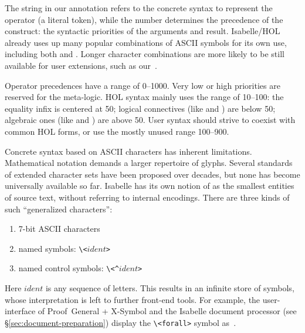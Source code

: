 \begin{isabellebody}
\begin{isamarkuptext}
  The string \isa{{\isachardoublequote}{\isacharbrackleft}{\isacharplus}{\isacharbrackright}{\isachardoublequote}} in our annotation refers to the
  concrete syntax to represent the operator (a literal token), while
  the number  determines the precedence of the construct:
  the syntactic priorities of the arguments and result.  Isabelle/HOL
  already uses up many popular combinations of ASCII symbols for its
  own use, including both \isa{{\isacharplus}} and \isa{{\isacharplus}{\isacharplus}}.  Longer
  character combinations are more likely to be still available for
  user extensions, such as our~\isa{{\isacharbrackleft}{\isacharplus}{\isacharbrackright}}.

  Operator precedences have a range of 0--1000.  Very low or high
  priorities are reserved for the meta-logic.  HOL syntax mainly uses
  the range of 10--100: the equality infix \isa{{\isacharequal}} is centered at
  50; logical connectives (like \isa{{\isasymor}} and \isa{{\isasymand}}) are
  below 50; algebraic ones (like \isa{{\isacharplus}} and \isa{{\isacharasterisk}}) are
  above 50.  User syntax should strive to coexist with common HOL
  forms, or use the mostly unused range 100--900.%
\end{isamarkuptext}%
\isamarkuptrue%
%
\isamarkuptrue%
%
\begin{isamarkuptext}%
Concrete syntax based on ASCII characters has inherent limitations.
  Mathematical notation demands a larger repertoire of glyphs.
  Several standards of extended character sets have been proposed over
  decades, but none has become universally available so far.  Isabelle
  has its own notion of  as the smallest entities of
  source text, without referring to internal encodings.  There are
  three kinds of such ``generalized characters'':

  \begin{enumerate}

  \item 7-bit ASCII characters

  \item named symbols: \verb,\,\verb,<,$ident$\verb,>,

  \item named control symbols: \verb,\,\verb,<^,$ident$\verb,>,

  \end{enumerate}

  Here $ident$ is any sequence of letters. 
  This results in an infinite store of symbols, whose
  interpretation is left to further front-end tools.  For example, the
  user-interface of Proof~General + X-Symbol and the Isabelle document
  processor (see \S\ref{sec:document-preparation}) display the
  \verb,\,\verb,<forall>, symbol as~\isa{{\isasymforall}}.


\end{isamarkuptext}
\end{isabellebody}
